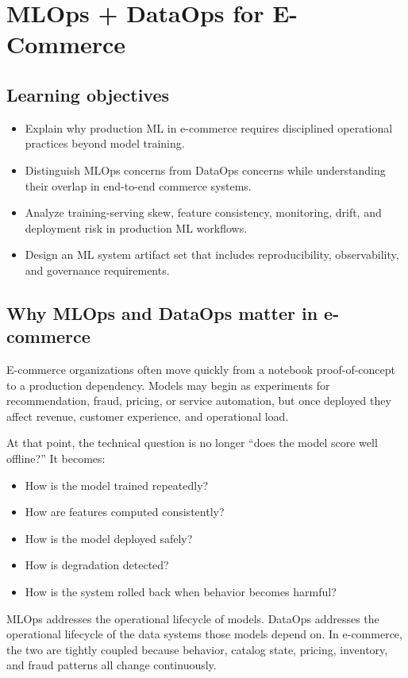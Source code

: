 \chapter{MLOps + DataOps for E-Commerce}

\section{Learning objectives}
\begin{itemize}
  \item Explain why production ML in e-commerce requires disciplined operational practices beyond model training.
  \item Distinguish MLOps concerns from DataOps concerns while understanding their overlap in end-to-end commerce systems.
  \item Analyze training-serving skew, feature consistency, monitoring, drift, and deployment risk in production ML workflows.
  \item Design an ML system artifact set that includes reproducibility, observability, and governance requirements.
\end{itemize}

\section{Why MLOps and DataOps matter in e-commerce}
E-commerce organizations often move quickly from a notebook proof-of-concept to a production dependency.
Models may begin as experiments for recommendation, fraud, pricing, or service automation, but once deployed they affect revenue, customer experience, and operational load.

At that point, the technical question is no longer ``does the model score well offline?''
It becomes:
\begin{itemize}
  \item How is the model trained repeatedly?
  \item How are features computed consistently?
  \item How is the model deployed safely?
  \item How is degradation detected?
  \item How is the system rolled back when behavior becomes harmful?
\end{itemize}

MLOps addresses the operational lifecycle of models.
DataOps addresses the operational lifecycle of the data systems those models depend on.
In e-commerce, the two are tightly coupled because behavior, catalog state, pricing, inventory, and fraud patterns all change continuously.

